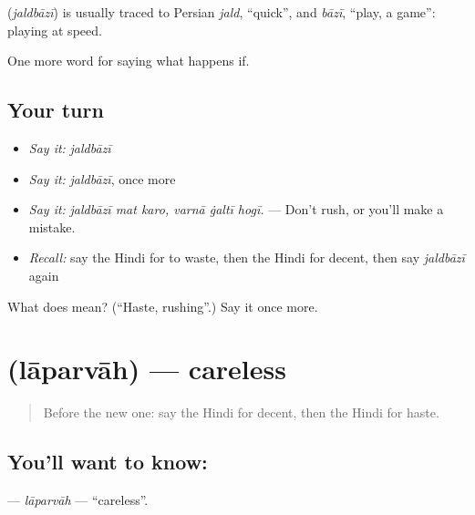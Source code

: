 \begin{cousinweb}
\textbf{} (\emph{jaldbāzī}) is usually traced to Persian \emph{jald}, \textquotedblleft{}quick\textquotedblright{}, and \emph{bāzī}, \textquotedblleft{}play, a game\textquotedblright{}: playing at speed.
\end{cousinweb}

\begin{grammarlens}[title={What you've built}]
One more word for saying what happens if.
\end{grammarlens}

\subsection*{Your turn}
\begin{itemize}
\raggedright
  \item \emph{Say it:} \emph{jaldbāzī}
  \item \emph{Say it:} \emph{jaldbāzī}, once more
  \item \emph{Say it:} \emph{jaldbāzī mat karo, varnā ġaltī hogī.} — Don't rush, or you'll make a mistake.
  \item \emph{Recall:} say the Hindi for to waste, then the Hindi for decent, then say \emph{jaldbāzī} again
\end{itemize}

\begin{tcolorbox}[breakable,colback=teal!4,colframe=teal!35!black,title={Before you move on}]
What does  mean? (\textquotedblleft{}Haste, rushing\textquotedblright{}.) Say it once more.
\end{tcolorbox}
\section[\texorpdfstring{\hi{लापरवाह} (lāparvāh)}{लापरवाह (lāparvāh)}]{ (lāparvāh) — careless}

\label{lesson:HI-C382-laparvah}



\begin{quote}
Before the new one: say the Hindi for decent, then the Hindi for haste.
\end{quote}

\subsection*{You'll want to know: }
\textbf{} — \emph{lāparvāh} — \textquotedblleft{}careless\textquotedblright{}.

